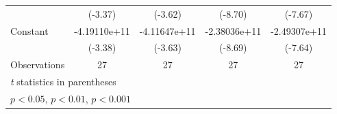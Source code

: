 {\begin{tabular}{l*{4}{c}}
                         &     (-3.37)         &     (-3.62)         &     (-8.70)         &     (-7.67)         \\
[1em]
Constant                 &-4.19110e+11\sym{**} &-4.11647e+11\sym{**} &-2.38036e+11\sym{***}&-2.49307e+11\sym{***}\\
                         &     (-3.38)         &     (-3.63)         &     (-8.69)         &     (-7.64)         \\
\hline
Observations             &          27         &          27         &          27         &          27         \\
\hline\hline
\multicolumn{5}{l}{\footnotesize \textit{t} statistics in parentheses}\\
\multicolumn{5}{l}{\footnotesize \sym{*} \(p<0.05\), \sym{**} \(p<0.01\), \sym{***} \(p<0.001\)}\\
\end{tabular}
}

